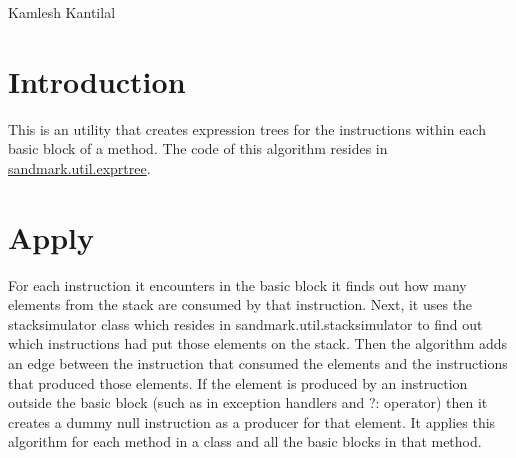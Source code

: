 %
          {Kamlesh Kantilal}

\section{Introduction}
This is an utility that creates expression trees for the instructions within each basic block of a method. The code of this algorithm resides in \url{sandmark.util.exprtree}.

\section{Apply}
For each instruction it encounters in the basic block it finds out how many elements from the stack are consumed by that instruction.
Next, it uses the stacksimulator class which resides in {sandmark.util.stacksimulator} to find out which instructions had put those elements on the stack. Then the algorithm adds an edge between the instruction that consumed the elements and the instructions that produced those elements.
If the element is produced by an instruction outside the basic block (such as in exception handlers and ?: operator) then it creates a dummy null instruction as a producer for that element.
It applies this algorithm for each method in a class and all the basic blocks in that method.



